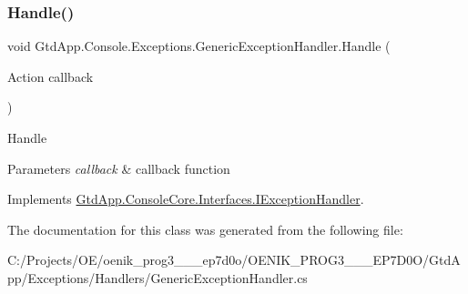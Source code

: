 \subsubsection{\texorpdfstring{Handle()}{Handle()}}
{\footnotesize\ttfamily void Gtd\+App.\+Console.\+Exceptions.\+Generic\+Exception\+Handler.\+Handle (\begin{DoxyParamCaption}\item[{Action}]{callback }\end{DoxyParamCaption})}



Handle 


\begin{DoxyParams}{Parameters}
{\em callback} & callback function\\
\hline
\end{DoxyParams}


Implements \mbox{\hyperlink{interface_gtd_app_1_1_console_core_1_1_interfaces_1_1_i_exception_handler_a4d0af5418cd0b240e5e1e437e2b571d9}{Gtd\+App.\+Console\+Core.\+Interfaces.\+I\+Exception\+Handler}}.



The documentation for this class was generated from the following file\+:\begin{DoxyCompactItemize}
\item 
C\+:/\+Projects/\+O\+E/oenik\+\_\+prog3\+\_\+\_\+\_\+ep7d0o/\+O\+E\+N\+I\+K\+\_\+\+P\+R\+O\+G3\+\_\+\_\+\_\+\+E\+P7\+D0\+O/\+Gtd\+App/\+Exceptions/\+Handlers/Generic\+Exception\+Handler.\+cs\end{DoxyCompactItemize}
